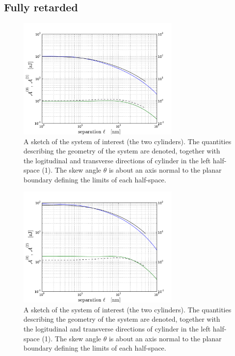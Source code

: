 \documentclass[onecolumn,letterpaper,amsmath,amssymb,floatfix,aps,superscriptaddress]{revtex4}
\begin{document}
\subsection{Fully retarded}

\begin{figure}
\centerline{\includegraphics[width=8cm]{140309_65w65_GH_skew_ret_A0_A2.pdf}}
\caption{A sketch of the system of interest (the two cylinders). The quantities describing the geometry of the system are 
denoted, together with the logitudinal and transverse directions of cylinder in the left half-space (1). The skew angle $\theta$ is about an axis normal to the planar boundary defining the limits of each half-space.
}
\label{fig:sketch}
\end{figure}

\begin{figure}
\centerline{\includegraphics[width=8cm]{140309_91w91_GH_skew_ret_A0_A2.pdf}}
\caption{A sketch of the system of interest (the two cylinders). The quantities describing the geometry of the system are 
denoted, together with the logitudinal and transverse directions of cylinder in the left half-space (1). The skew angle $\theta$ is about an axis normal to the planar boundary defining the limits of each half-space.
}
\label{fig:sketch}
\end{figure}
\end{document}
